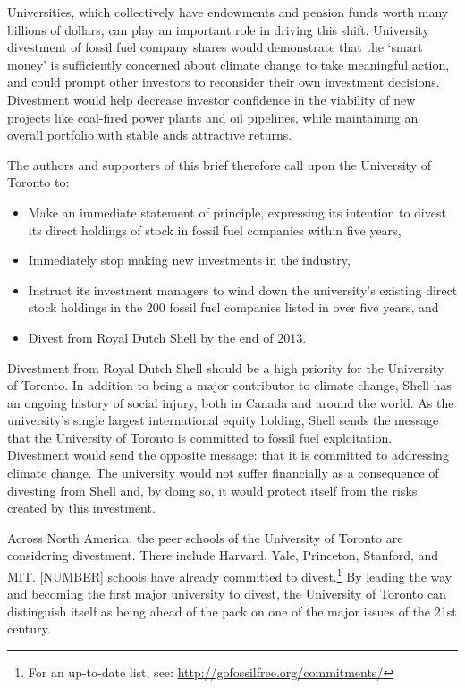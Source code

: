 Universities, which collectively have endowments and pension funds worth many billions of dollars, can play an important role in driving this shift.
University divestment of fossil fuel company shares would demonstrate that the `smart money' is sufficiently concerned about climate change to take meaningful action, and could prompt other investors to reconsider their own investment decisions. 
Divestment would help decrease investor confidence in the viability of new projects like coal-fired power plants and oil pipelines, while maintaining an overall portfolio with stable ands attractive returns.



The authors and supporters of this brief therefore call upon the University of Toronto to:
\begin{itemize}
	\item Make an immediate statement of principle, expressing its intention to divest its direct holdings of stock in fossil fuel companies within five years,
	\item Immediately stop making new investments in the industry,
	\item Instruct its investment managers to wind down the university’s existing direct stock holdings in the 200 fossil fuel companies listed in  over five years, and
	\item Divest from Royal Dutch Shell by the end of 2013.
\end{itemize}



Divestment from Royal Dutch Shell should be a high priority for the University of Toronto. 
In addition to being a major contributor to climate change, Shell has an ongoing history of social injury, both in Canada and around the world. 
As the university's single largest international equity holding, Shell sends the message that the University of Toronto is committed to fossil fuel exploitation. 
Divestment would send the opposite message: that it is committed to addressing climate change.  
The university would not suffer financially as a consequence of divesting from Shell and, by doing so, it would protect itself from the risks created by this investment.



Across North America, the peer schools of the University of Toronto are considering divestment.
There include Harvard, Yale, Princeton, Stanford, and MIT.
[NUMBER] schools have already committed to divest.\footnote{For an up-to-date list, see: \url{http://gofossilfree.org/commitments/}}
By leading the way and becoming the first major university to divest, the University of Toronto can distinguish itself as being ahead of the pack on one of the major issues of the 21st century.



